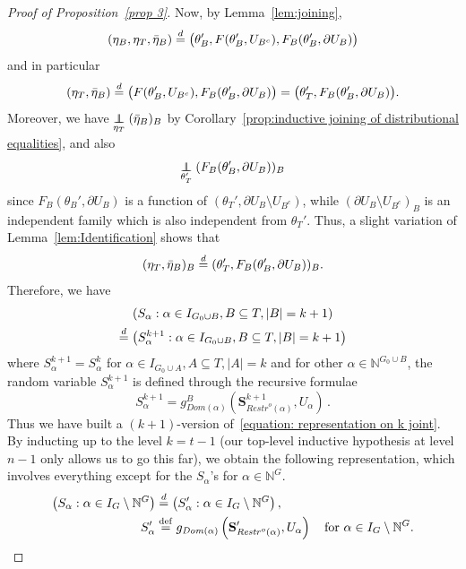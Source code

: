 \documentclass[AHL,Unicode,longabstracts,published]{cedram}
\newcommand{\independent}{\protect\mathpalette{\protect\independenT}{\perp}}\def\independenT#1#2{\mathrel{\rlap{$#1#2$}\mkern2mu{#1#2}}}
\newcommand{\alf}{\alpha}%
\newcommand*{\defeq}{\stackrel{\mathrm{def}}{=}}
\newcommand{\indices}[1]{\mathbb{N}^{#1}}
\renewcommand{\d}{\buildrel{d}\over{=}}
\newcommand*\srstr{\mathit{Restr}^o}
\newcommand*\dom{\mathit{Dom}}
\newcommand*\N{\mathbb{N}}
\newcommand*\bS{\mathbf{S}}
\newcommand*\N{\mathbb{N}}
\begin{document}
\begin{proof}[Proof of Proposition~\ref{prop 3}]
Now, by Lemma~\ref{lem:joining},
\[
(\eta_B,\eta_T,\bar\eta_B) \d \big(\theta_B', F(\theta_B',U_{B^c}), F_B(\theta_B',\partial U_B)\big)
\]
and in particular
\[
(\eta_T, \bar\eta_B) \d \big(F(\theta_B',U_{B^c}), F_B(\theta_B',\partial U_B)\big)=\big(\theta_T', F_B(\theta_B',\partial U_B)\big).
\]
Moreover, we have $\underset{\eta_T}{\independent}(\bar\eta_B)_B$ by Corollary~\ref{prop:inductive joining of distributional equalities}, and also
\[
\underset{\theta_T'}{\independent}(F_B(\theta_B', \partial U_B))_B
\]
since $F_B(\theta_B',\partial U_B)$ is a function of $(\theta_T', \partial U_B \setminus U_{B^c})$, while $(\partial U_B \setminus U_{B^c})_B$ is an independent family which is also independent from $\theta_T'$. Thus, a slight variation of Lemma~\ref{lem:Identification} shows that
\[
(\eta_T, \bar\eta_B)_B \d (\theta_T', F_B(\theta_B', \partial U_B))_B.
\]
Therefore, we have
\begin{multline}\label{equation: representation on k+1 joint}
\left(S_\alf :{\alf \in I_{G_0 \cup B}}, B \subseteq T, |B|=k+1\right) \\
\d \left({S_\alf ^{k+1}}: \alf \in I_{G_0 \cup B}, B \subseteq T, |B|=k+1\right)
\end{multline}
where ${S_\alf ^{k+1}}=S^k_\alf $ for $\alf \in I_{G_0 \cup A}, A \subseteq T, |A|=k$ and for other $\alf \in \indices {G_0 \cup B}$, the random variable ${S_\alf ^{k+1}}$ is defined through the recursive formulae
\[
{S_\alf ^{k+1}}=g^B_{\dom(\alf)}\left({\bS^{k+1}_{\srstr(\alf)}}, U_\alf\right)\,.
\]
Thus we have built a $(k+1)$-version of~\eqref{equation: representation on k joint}. By inducting up to the level $k=t-1$ (our top-level inductive hypothesis at level $n-1$ only allows us to go this far), we obtain the following representation, which involves everything except for the $S_\alf$'s for $\alf \in \N^G$.
\begin{equation}\label{equation: representation on t-1}
\begin{aligned}
\left(S_\alf :{\alf \in I_G\setminus \N^G}\right) & \d \left(S'_\alf : {\alf \in I_G\setminus \N^G}\right),
\\
S'_\alf &
\defeq g_{\dom(\alf)}\left(\bS'_{\srstr(\alf)}, U_\alf\right)
\quad\text{for } \alf \in { I_G\setminus \N^G}.
\end{aligned}
\end{equation}



\end{proof}
\end{document}
